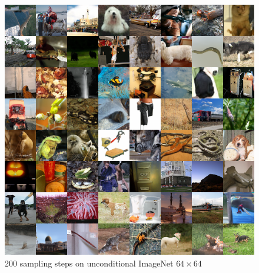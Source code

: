 \documentclass{article}
\begin{document}
\begin{figure}[h!]
    \centerline{\includegraphics[width=0.78\columnwidth]{samples_hybrid_200steps_1.5M_grid.png}}
    \caption{200 sampling steps on unconditional ImageNet $64 \times 64$}
    \vskip -0.4in
\end{figure}
\end{document}
